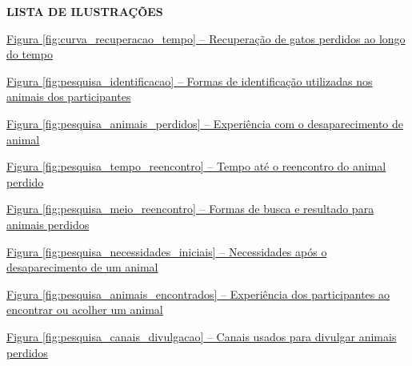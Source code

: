 \thispagestyle{empty}

\begin{center}
    \textbf{\large LISTA DE ILUSTRAÇÕES}
\end{center}

\vspace{0.8cm}

\noindent \hyperref[fig:curva_recuperacao_tempo]{Figura \ref*{fig:curva_recuperacao_tempo} -- Recuperação de gatos perdidos ao longo do tempo \dotfill \pageref{fig:curva_recuperacao_tempo}}\par\vspace{0.12cm}
\noindent \hyperref[fig:pesquisa_identificacao]{Figura \ref*{fig:pesquisa_identificacao} -- Formas de identificação utilizadas nos animais dos participantes \dotfill \pageref{fig:pesquisa_identificacao}}\par\vspace{0.12cm}
\noindent \hyperref[fig:pesquisa_animais_perdidos]{Figura \ref*{fig:pesquisa_animais_perdidos} -- Experiência com o desaparecimento de animal \dotfill \pageref{fig:pesquisa_animais_perdidos}}\par\vspace{0.12cm}
\noindent \hyperref[fig:pesquisa_tempo_reencontro]{Figura \ref*{fig:pesquisa_tempo_reencontro} -- Tempo até o reencontro do animal perdido \dotfill \pageref{fig:pesquisa_tempo_reencontro}}\par\vspace{0.12cm}
\noindent \hyperref[fig:pesquisa_meio_reencontro]{Figura \ref*{fig:pesquisa_meio_reencontro} -- Formas de busca e resultado para animais perdidos \dotfill \pageref{fig:pesquisa_meio_reencontro}}\par\vspace{0.12cm}
\noindent \hyperref[fig:pesquisa_necessidades_iniciais]{Figura \ref*{fig:pesquisa_necessidades_iniciais} -- Necessidades após o desaparecimento de um animal \dotfill \pageref{fig:pesquisa_necessidades_iniciais}}\par\vspace{0.12cm}
\noindent \hyperref[fig:pesquisa_animais_encontrados]{Figura \ref*{fig:pesquisa_animais_encontrados} -- Experiência dos participantes ao encontrar ou acolher um animal \dotfill \pageref{fig:pesquisa_animais_encontrados}}\par\vspace{0.12cm}
\noindent \hyperref[fig:pesquisa_canais_divulgacao]{Figura \ref*{fig:pesquisa_canais_divulgacao} -- Canais usados para divulgar animais perdidos \dotfill \pageref{fig:pesquisa_canais_divulgacao}}\par\vspace{0.12cm}
